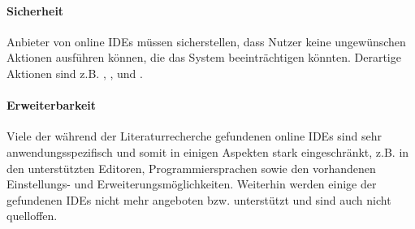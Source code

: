 \paragraph{Sicherheit}
Anbieter von online IDEs müssen sicherstellen, dass Nutzer keine ungewünschen Aktionen ausführen können, die das System beeinträchtigen könnten. Derartige Aktionen sind z.B. , ,  \cite{wu_ceclipse_2011} und  \cite{srinivasa_bad_2022}.

\paragraph{Erweiterbarkeit}
Viele der während der Literaturrecherche gefundenen online IDEs sind sehr anwendungsspezifisch und somit in einigen Aspekten stark eingeschränkt, z.B. in den unterstützten Editoren, Programmiersprachen sowie den vorhandenen Einstellungs- und Erweiterungsmöglichkeiten. Weiterhin werden einige der gefundenen IDEs nicht mehr angeboten bzw. unterstützt und sind auch nicht quelloffen.
